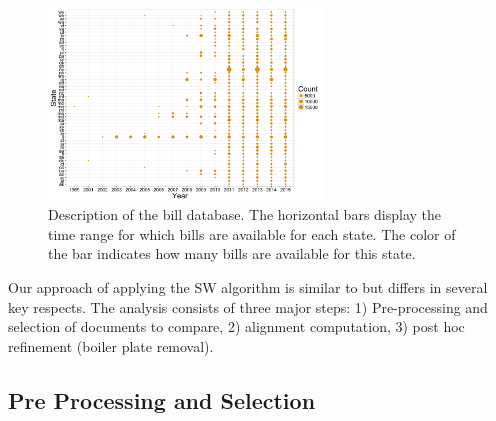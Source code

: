 \documentclass[12pt]{article} %
\begin{document}
\begin{figure}[ht!]
    \centering
    \includegraphics[width=0.65\textwidth]{figures/year_count_by_state.png}
    \caption{Description of the bill database. The horizontal bars display the time range for which bills are available for each state. The color of the bar indicates how many bills are available for this state.}
    \label{fig:bill_desc}
\end{figure}

Our approach of applying the SW algorithm is similar to
\citet{wilkerson2015tracing} but differs in several key respects. The analysis
consists of three major steps: 1) Pre-processing and selection of documents to compare, 2) alignment computation, 3) post hoc refinement (boiler plate removal). 




\subsection{Pre Processing and Selection}
\end{document}
